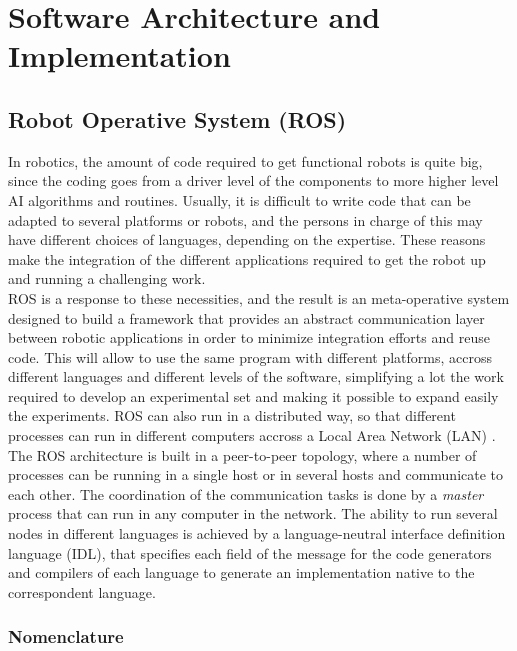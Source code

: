 \chapter{Software Architecture and Implementation}
\label{chap:Software_Architecture_and_Implementation}

\section{Robot Operative System (ROS)}

In robotics, the amount of code required to get functional robots is quite big, since the coding goes from a driver level of the components to more higher level AI algorithms and routines. Usually, it is difficult to write code that can be adapted to several platforms or robots, and the persons in charge of this may have different choices of languages, depending on the expertise. These reasons make the integration of the different applications required to get the robot up and running a challenging work.\\

ROS is a response to these necessities, and the result is an meta-operative system designed to build a framework that provides an abstract communication layer between robotic applications in order to minimize integration efforts and reuse code. This will allow to use the same program with different platforms, accross different languages and different levels of the software, simplifying a lot the work required to develop an experimental set and making it possible to expand easily the experiments. ROS can also run in a distributed way, so that different processes can run in different computers accross a Local Area Network (LAN) \cite{QuigleyetAl2009}.\\

The ROS architecture is built in a peer-to-peer topology, where a number of processes can be running in a single host or in several hosts and communicate to each other. The coordination of the communication tasks is done by a \emph{master} process that can run in any computer in the network. The ability to run several nodes in different languages is achieved by a language-neutral interface definition language (IDL), that specifies each field of the message for the code generators and compilers of each language to generate an implementation native to the correspondent language. 

\subsection{Nomenclature}

